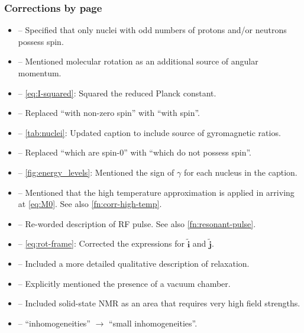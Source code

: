 \documentclass[12pt]{article}
\begin{document}
    \subsubsection*{Corrections by page}
    \begin{itemize}
        \item {} -- Specified that only nuclei with odd
            numbers of protons and/or neutrons possess spin.
        \item {} -- Mentioned molecular rotation as
            an additional source of angular momentum.
        \item {} -- \cref{eq:I-squared}: Squared the
            reduced Planck constant.
        \item {} -- Replaced ``with non-zero spin'' with
            ``with spin''.
        \item {} -- \cref{tab:nuclei}: Updated caption to
            include source of gyromagnetic ratios.
        \item {} -- Replaced ``which are spin-0'' with ``which
            do not possess spin''.
        \item {} --  \cref{fig:energy_levels}:
            Mentioned the sign of $\gamma$ for each nucleus in the caption.
        \item {} --  Mentioned that the high temperature
            approximation is applied in arriving at \cref{eq:M0}. See also
            \cref{fn:corr-high-temp}.
        \item {} --  Re-worded description of RF pulse.
            See also \cref{fn:resonant-pulse}.
        \item {} -- \cref{eq:rot-frame}: Corrected the
            expressions for $\tilde{\symbf{i}}$ and $\tilde{\symbf{j}}$.
        \item {} -- Included a more detailed
            qualitative description of relaxation.
        \item {} -- Explicitly mentioned the presence of a
            vacuum chamber.
        \item {} -- Included solid-state NMR as an
            area that requires very high field strengths.
        \item {} -- ``inhomogeneities''
            $\rightarrow$ ``small inhomogeneities''.

\end{itemize}
\end{document}
